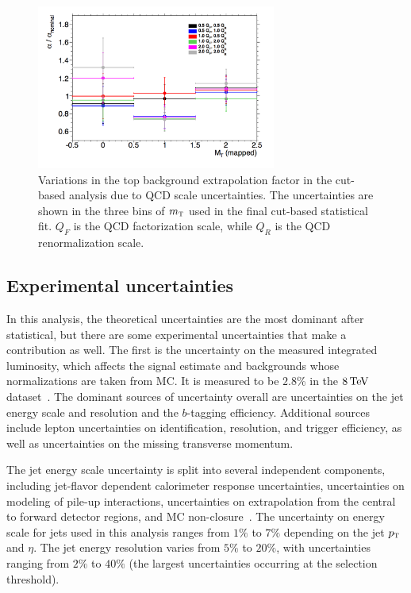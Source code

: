 \begin{figure}[h!]
  \centering
  \captionsetup{justification=centering}
  \includegraphics[width=0.7\textwidth]{figures/VBF_cb_tt_qcd}
  \caption{Variations in the top background extrapolation factor in the cut-based analysis due to QCD scale uncertainties. The uncertainties are shown in the three bins of $m_{\textrm{\footnotesize\sc t}}$ used in the final cut-based statistical fit. $Q_{F}$ is the QCD factorization scale, while $Q_{R}$ is the QCD renormalization scale.}
  \label{fig:vbf_tt_qcd}
\end{figure}

\subsection{Experimental uncertainties}

In this analysis, the theoretical uncertainties are the most dominant after statistical, but there are some experimental uncertainties that make a contribution as well. The first is the uncertainty on the measured integrated luminosity, which affects the signal estimate and backgrounds whose normalizations are taken from MC. It is measured to be $2.8$\% in the $8 \TeV$ dataset~\cite{luminosity-paper}. The dominant sources of uncertainty overall are uncertainties on the jet energy scale and resolution and the $b$-tagging efficiency. Additional sources include lepton uncertainties on identification, resolution, and trigger efficiency, as well as uncertainties on the missing transverse momentum. 

The jet energy scale uncertainty is split into several independent components, including jet-flavor dependent calorimeter response uncertainties, uncertainties on modeling of pile-up interactions, uncertainties on extrapolation from the central to forward detector regions, and MC non-closure~\cite{atlas_jets}. The uncertainty on energy scale for jets used in this analysis ranges from $1\%$ to $7\%$ depending on the jet $p_{\textrm{\footnotesize\sc t}}$ and $\eta$. The jet energy resolution varies from $5\%$ to $20\%$, with uncertainties ranging from $2\%$ to $40\%$ (the largest uncertainties occurring at the selection threshold).

